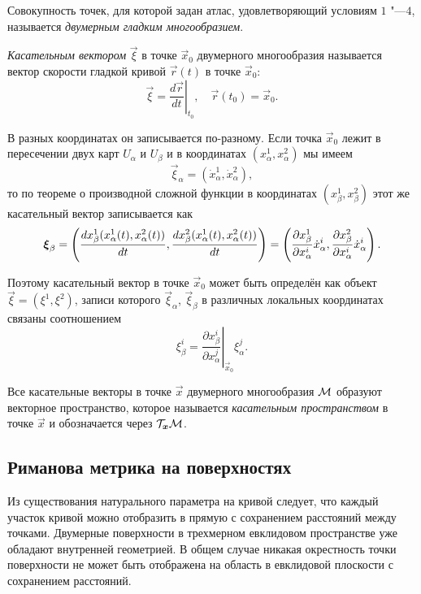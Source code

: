 \begin{definition}
	Совокупность точек, для которой задан атлас, удовлетворяющий условиям $1$ "---$4$, называется \textit{двумерным гладким многообразием}.
\end{definition}

\begin{definition}
	\textit{Касательным вектором} $\vec{\xi}$ в точке $\vec{x}_0$ двумерного многообразия называется вектор скорости гладкой кривой $\vec{r}(t)$ в точке $\vec{x}_0$:
	\[
		\vec{\xi} = \left.\frac{d\vec{r}}{dt}\right|_{t_0},\quad \vec{r}(t_0) = \vec{x}_0.
	\]
\end{definition}

В разных координатах он записывается по-разному. Если точка $\vec{x}_0$ лежит в пересечении двух карт $U_\alpha$ и $U_\beta$ и в координатах $(x_\alpha^1, x_\alpha^2)$ мы имеем
\[
	\vec{\xi}_\alpha = (\dot{x}^1_\alpha, \dot{x}^2_\alpha),
\]
то по теореме о производной сложной функции в координатах $(x_\beta^1, x_\beta^2)$ этот же касательный вектор записывается как
\[
	\boldsymbol{\xi}_\beta = \left(\frac{dx_\beta^1(x_\alpha^1(t), x_\alpha^2(t))}{dt}, \frac{dx_\beta^2(x_\alpha^1(t), x_\alpha^2(t))}{dt}\right) = \left(\frac{\partial x_\beta^1}{\partial x^i_\alpha}\dot{x}_\alpha^i, \frac{\partial x_\beta^2}{\partial x^i_\alpha}\dot{x}_\alpha^i\right).
\]

Поэтому касательный вектор в точке $\vec{x}_0$ может быть определён как объект $\vec{\xi} = (\xi^1, \xi^2)$, записи которого $\vec{\xi}_\alpha$, $\vec{\xi}_\beta$ в различных локальных координатах связаны соотношением
\[
	\xi_\beta^i = \left.\frac{\partial x_\beta^i}{\partial x_\alpha^j}\right|_{\vec{x}_0}\xi^j_\alpha.
\]

\begin{definition}
	Все касательные векторы в точке $\vec{x}$ двумерного многообразия $\mathcal{M}$ образуют векторное пространство, которое называется \textit{касательным пространством} в точке $\vec{x}$ и обозначается через $\mathcal{T}_{\boldsymbol{x}}\mathcal{M}$.
\end{definition}

\subsection{Риманова метрика на поверхностях}

Из существования натурального параметра на кривой следует, что каждый участок кривой можно отобразить в прямую с сохранением расстояний между точками. Двумерные поверхности в трехмерном евклидовом пространстве уже обладают внутренней геометрией. В общем случае никакая окрестность точки поверхности не может быть отображена на область в евклидовой плоскости с сохранением расстояний.

